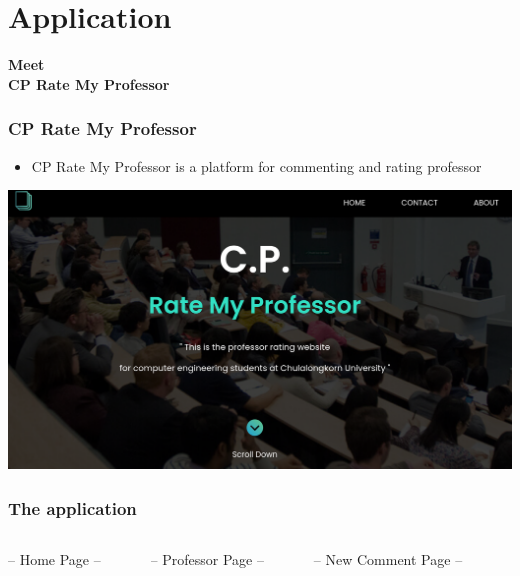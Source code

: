 \documentclass[aspectratio=169]{beamer}
\begin{document}
\section{Application}
\begin{frame}
    \centering
    \begin{spacing}{3}
        {\huge \textbf{Meet} }\pause\\
        {\huge \color{cyan}\textbf{CP Rate My Professor}}
    \end{spacing}
\end{frame}
\begin{frame}
    \frametitle{CP Rate My Professor}
    \begin{itemize}
        \item CP Rate My Professor is a platform for commenting and rating professor\pause
    \end{itemize}
    \centering
    \includegraphics[scale=0.25]{ratemyprof_home.png}
\end{frame}
\begin{frame}
    \frametitle{The application}
    \begin{center}
        \begin{columns}
            \begin{column}{0.3\textwidth}
                \centering
                -- Home Page --
            \end{column}
            \begin{column}{0.3\textwidth}
                \centering
                -- Professor Page --

            \end{column}
            \centering
            -- New Comment Page --
            \begin{column}{0.3\textwidth}

            \end{column}
        \end{columns}
    \end{center}
\end{frame}
\end{document}

